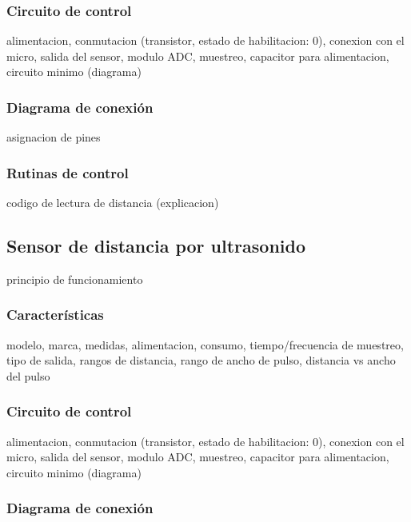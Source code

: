 \subsubsection{Circuito de control}
\label{h_sensado_telemetros_circuito}

alimentacion, conmutacion (transistor, estado de habilitacion: 0), conexion con el micro, salida del sensor, modulo ADC, muestreo, capacitor para alimentacion, circuito minimo (diagrama)

\subsubsection{Diagrama de conexi\'on}
\label{h_sensado_telemetros_diagrama}

asignacion de pines

\subsubsection{Rutinas de control}
\label{h_sensado_telemetros_rutinas}

codigo de lectura de distancia (explicacion)

\subsection{Sensor de distancia por ultrasonido}
\label{h_sensado_ultrasonido}

principio de funcionamiento

\subsubsection{Caracter\'isticas}
\label{h_sensado_ultrasonido_caracteristicas}

modelo, marca, medidas, alimentacion, consumo, tiempo/frecuencia de muestreo, tipo de salida, rangos de distancia, rango de ancho de pulso, distancia vs ancho del pulso

\subsubsection{Circuito de control}
\label{h_sensado_ultrasonido_circuito}

alimentacion, conmutacion (transistor, estado de habilitacion: 0), conexion con el micro, salida del sensor, modulo ADC, muestreo, capacitor para alimentacion, circuito minimo (diagrama)

\subsubsection{Diagrama de conexi\'on}
\label{h_sensado_ultrasonido_diagrama}

